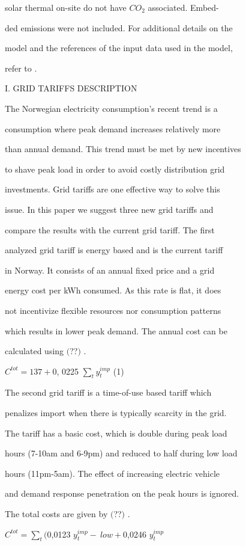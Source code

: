 \documentclass[a4paper,12pt]{article}
\begin{document}
solar thermal on-site do not have $CO_{2}$ associated. Embed-

ded emissions were not included. For additional details on the

model and the references of the input data used in the model,

refer to .

I. GRID TARIFFS DESCRIPTION

The Norwegian electricity consumption’s recent trend is a

consumption where peak demand increases relatively more

than annual demand. This trend must be met by new incentives

to shave peak load in order to avoid costly distribution grid

investments. Grid tariffs are one effective way to solve this

issue. In this paper we suggest three new grid tariffs and

compare the results with the current grid tariff. The first

analyzed grid tariff is energy based and is the current tariff

in Norway. It consists of an annual fixed price and a grid

energy cost per kWh consumed. As this rate is flat, it does

not incentivize flexible resources nor consumption patterns

which results in lower peak demand. The annual cost can be

calculated using $($??$)$ .
\begin{center}
$C^{tot}=137+0$, 0225 $\displaystyle \sum_{t} y_{t}^{imp}$   (1)
\end{center}
The second grid tariff is a time-of-use based tariff which

penalizes import when there is typically scarcity in the grid.

The tariff has a basic cost, which is double during peak load

hours (7-10am and 6-9pm) and reduced to half during low load

hours (11pm-5am). The effect of increasing electric vehicle

and demand response penetration on the peak hours is ignored.

The total costs are given by $($??$)$ .

$C^{tot}=\displaystyle \sum_{t}(0$,0123 $y_{t}^{imp}-\ low+0$,0246 $y_{t}^{imp}$
\end{document}
